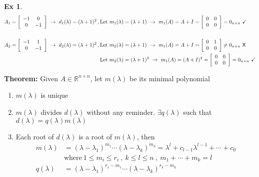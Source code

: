 \documentclass[twoside]{article}
\newtheorem{exmp}[theorem]{Ex}
\begin{document}
\begin{exmp}
\begin{align*}
A_1 =   \left[ \begin{array}{cc} -1 & 0  \\ 0 & -1 \end{array} \right] \ \rightarrow \ d_1(\lambda) = (\lambda + 1)^2 \, , \, &\mathrm{Let} \ m_1(\lambda) = (\lambda + 1) \ \rightarrow \ m_1(A) = A + I =  \left[ \begin{array}{cc} 0 & 0  \\ 0 & 0 \end{array} \right] = 0_{n \times n} \ \checkmark
\\
\\
A_2 =   \left[ \begin{array}{cc} -1 & 1  \\ 0 & -1 \end{array} \right] \ \rightarrow \ d_2(\lambda) = (\lambda + 1)^2 \, , \, &\mathrm{Let} \ m_2(\lambda) = (\lambda + 1) \ \rightarrow \ m_1(A) = A + I =  \left[ \begin{array}{cc} 0 & 1  \\ 0 & 0 \end{array} \right] \neq 0_{n \times n} \ \text{\sffamily X}
\\
&\mathrm{Let} \ m_2(\lambda) = (\lambda + 1)^2 \ \rightarrow \ m_1(A) = (A + I)^2 =  \left[ \begin{array}{cc} 0 & 0  \\ 0 & 0 \end{array} \right] = 0_{n \times n} \ \checkmark
\end{align*}
\end{exmp}

\textbf{Theorem:} Given $A \in \mathbb{R}^{n \times n}$, let $m(\lambda)$ be its minimal polynomial 
\begin{enumerate}
	\item $m(\lambda)$ is unique
	\item $m(\lambda)$ divides $d(\lambda)$ without any reminder. $\exists q(\lambda)$ such that $d(\lambda) = q(\lambda) m(\lambda)$ 
	\item Each root of $d(\lambda)$ is a root of $m(\lambda)$, then 
\begin{align*}
m(\lambda) &= (\lambda - \lambda_1)^{m_1} \cdots (\lambda - \lambda_k)^{m_k} = \lambda^l + c_{l-1} \lambda^{l-1} + \cdots + c_0 
\\
&\mathrm{where} \ 1 \leq m_i \leq r_i \ , \ k \leq l \leq n \ , \ m_1 + \cdots + m_k = l
\\
q(\lambda) &= (\lambda - \lambda_1)^{r_1-m_1} \cdots (\lambda - \lambda_k)^{r_k-m_k} 
\end{align*}
\end{enumerate}
\end{document}
